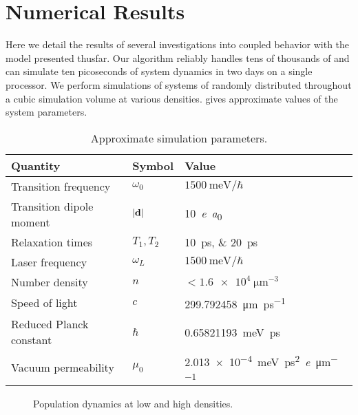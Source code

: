 \section{Numerical Results}
Here we detail the results of several investigations into coupled \qd{} behavior with the model presented thusfar.
Our algorithm reliably handles tens of thousands of \qds{} and can simulate ten picoseconds of system dynamics in two days on a single processor.
We perform simulations of systems of \qds{} randomly distributed throughout a cubic simulation volume at various densities.
 gives approximate values of the system parameters.

\begin{table}
  \begin{ruledtabular}
    \begin{tabular}{lll}
      Quantity                 & Symbol         & Value                        \\ \hline
      Transition frequency     & $\omega_0$     & $\SI{1500}{\milli\eV}/\hbar$ \\
      Transition dipole moment & $\abs{\vb{d}}$ & \SI{10}{\elementarycharge\bohr} \\
      Relaxation times         & $T_{1}, T_{2}$ & \SIlist{10;20}{\pico\second} \\
      Laser frequency          & $\omega_L$     & $\SI{1500}{\milli\eV}/\hbar$ \\
      Number density           & $n$            & $< \SI{1.6e4}{\micro\meter\tothe{-3}}$ \\
      \hline
      Speed of light           & $c$            & \SI{299.792458}{\micro\meter\per\pico\second} \\
      Reduced Planck constant  & $\hbar$        & \SI{0.65821193}{\milli\eV \pico\second} \\
      Vacuum permeability      & $\mu_0$        & \SI{2.013e-4}{\milli\eV \pico\second\squared \per \elementarycharge \per \micro\meter}
    \end{tabular}
  \end{ruledtabular}
  \caption{\label{table:parameters}Approximate simulation parameters.}
\end{table}

\begin{figure}
  
  \caption{\label{fig:density stats}Population dynamics at low and high densities.}
\end{figure}

